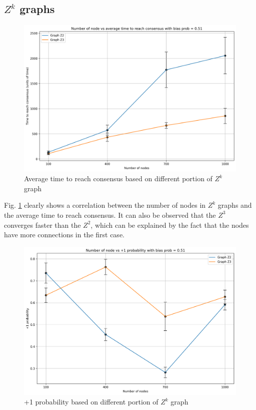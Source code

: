 \documentclass[conference]{IEEEtran}
\begin{document}
    \subsection{$Z^k$ graphs}

        \begin{figure}[!ht]
            \centering
            \includegraphics[width=\columnwidth]{media/z_times_bias_0.51.png}
            \caption[short]{Average time to reach consensus based on different portion of $Z^k$ graph}
            \label{fig:z_times}
        \end{figure}

        Fig. \ref{fig:z_times} clearly shows a correlation between the number of nodes in $Z^k$ graphs and the average time to reach consensus.
        It can also be observed that the $Z^3$ converges faster than the $Z^2$, which can be explained by the fact that the nodes have more connections in the first case. 

        \begin{figure}[!ht]
            \centering
            \includegraphics[width=\columnwidth]{media/z_consensus_bias_0.51.png}
            \caption[short]{+1 probability based on different portion of $Z^k$ graph}
            \label{fig:z_consensus}
        \end{figure}
\end{document}
